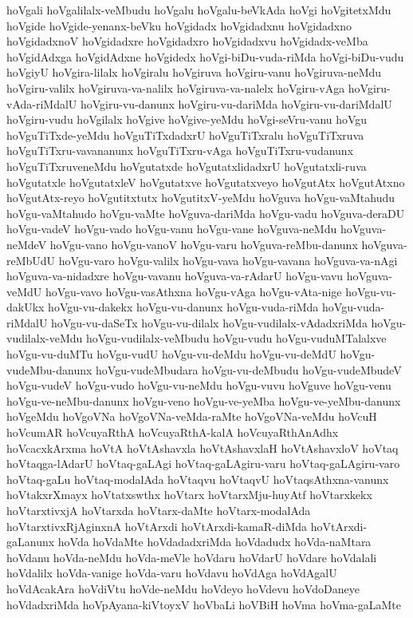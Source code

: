 {hoVgali
hoVgalilalx-veMbudu
hoVgalu
hoVgalu-beVkAda
hoVgi
hoVgitetxMdu
hoVgide
hoVgide-yenanx-beVku
hoVgidadx
hoVgidadxnu
hoVgidadxno
hoVgidadxnoV
hoVgidadxre
hoVgidadxro
hoVgidadxvu
hoVgidadx-veMba
hoVgidAdxga
hoVgidAdxne
hoVgidedx
hoVgi-biDu-vuda-riMda
hoVgi-biDu-vudu
hoVgiyU
hoVgira-lilalx
hoVgiralu
hoVgiruva
hoVgiru-vanu
hoVgiruva-neMdu
hoVgiru-valilx
hoVgiruva-va-nalilx
hoVgiruva-va-nalelx
hoVgiru-vAga
hoVgiru-vAda-riMdalU
hoVgiru-vu-danunx
hoVgiru-vu-dariMda
hoVgiru-vu-dariMdalU
hoVgiru-vudu
hoVgilalx
hoVgive
hoVgive-yeMdu
hoVgi-seVru-vanu
hoVgu
hoVguTiTxde-yeMdu
hoVguTiTxdadxrU
hoVguTiTxralu
hoVguTiTxruva
hoVguTiTxru-vavananunx
hoVguTiTxru-vAga
hoVguTiTxru-vudanunx
hoVguTiTxruveneMdu
hoVgutatxde
hoVgutatxlidadxrU
hoVgutatxli-ruva
hoVgutatxle
hoVgutatxleV
hoVgutatxve
hoVgutatxveyo
hoVgutAtx
hoVgutAtxno
hoVgutAtx-reyo
hoVgutitxtutx
hoVgutitxV-yeMdu
hoVguva
hoVgu-vaMtahudu
hoVgu-vaMtahudo
hoVgu-vaMte
hoVguva-dariMda
hoVgu-vadu
hoVguva-deraDU
hoVgu-vadeV
hoVgu-vado
hoVgu-vanu
hoVgu-vane
hoVguva-neMdu
hoVguva-neMdeV
hoVgu-vano
hoVgu-vanoV
hoVgu-varu
hoVguva-reMbu-danunx
hoVguva-reMbUdU
hoVgu-varo
hoVgu-valilx
hoVgu-vava
hoVgu-vavana
hoVguva-va-nAgi
hoVguva-va-nidadxre
hoVgu-vavanu
hoVguva-va-rAdarU
hoVgu-vavu
hoVguva-veMdU
hoVgu-vavo
hoVgu-vasAthxna
hoVgu-vAga
hoVgu-vAta-nige
hoVgu-vu-dakUkx
hoVgu-vu-dakekx
hoVgu-vu-danunx
hoVgu-vuda-riMda
hoVgu-vuda-riMdalU
hoVgu-vu-daSeTx
hoVgu-vu-dilalx
hoVgu-vudilalx-vAdadxriMda
hoVgu-vudilalx-veMdu
hoVgu-vudilalx-veMbudu
hoVgu-vudu
hoVgu-vuduMTalalxve
hoVgu-vu-duMTu
hoVgu-vudU
hoVgu-vu-deMdu
hoVgu-vu-deMdU
hoVgu-vudeMbu-danunx
hoVgu-vudeMbudara
hoVgu-vu-deMbudu
hoVgu-vudeMbudeV
hoVgu-vudeV
hoVgu-vudo
hoVgu-vu-neMdu
hoVgu-vuvu
hoVguve
hoVgu-venu
hoVgu-ve-neMbu-danunx
hoVgu-veno
hoVgu-ve-yeMba
hoVgu-ve-yeMbu-danunx
hoVgeMdu
hoVgoVNa
hoVgoVNa-veMda-raMte
hoVgoVNa-veMdu
hoVcuH
hoVcumAR
hoVcuyaRthA
hoVcuyaRthA-kalA
hoVcuyaRthAnAdhx
hoVcacxkArxma
hoVtA
hoVtAshavxla
hoVtAshavxlaH
hoVtAshavxloV
hoVtaq
hoVtaqga-lAdarU
hoVtaq-gaLAgi
hoVtaq-gaLAgiru-varu
hoVtaq-gaLAgiru-varo
hoVtaq-gaLu
hoVtaq-modalAda
hoVtaqvu
hoVtaqvU
hoVtaqsAthxna-vanunx
hoVtakxrXmayx
hoVtatxswthx
hoVtarx
hoVtarxMju-huyAtf
hoVtarxkekx
hoVtarxtivxjA
hoVtarxda
hoVtarx-daMte
hoVtarx-modalAda
hoVtarxtivxRjAginxnA
hoVtArxdi
hoVtArxdi-kamaR-diMda
hoVtArxdi-gaLanunx
hoVda
hoVdaMte
hoVdadadxriMda
hoVdadudx
hoVda-naMtara
hoVdanu
hoVda-neMdu
hoVda-meVle
hoVdaru
hoVdarU
hoVdare
hoVdalali
hoVdalilx
hoVda-vanige
hoVda-varu
hoVdavu
hoVdAga
hoVdAgalU
hoVdAcakAra
hoVdiVtu
hoVde-neMdu
hoVdeyo
hoVdevu
hoVdoDaneye
hoVdadxriMda
hoVpAyana-kiVtoyxV
hoVbaLi
hoVBiH
hoVma
hoVma-gaLaMte
}
